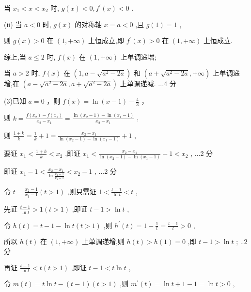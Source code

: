 \documentclass[10pt]{article}
\begin{document}
当 \({x}_{1} < x < {x}_{2}\) 时, \(g\left( x\right)  < 0,{f}^{\prime }\left( x\right)  < 0\) .

(ii) 当 \(a < 0\) 时, \(g\left( x\right)\) 的对称轴 \(x = a < 0\) ,且 \(g\left( 1\right)  = 1\) ,

则 \(g\left( x\right)  > 0\) 在 \(\left( {1, + \infty }\right)\) 上恒成立,即 \({f}^{\prime }\left( x\right)  > 0\) 在 \(\left( {1, + \infty }\right)\) 上恒成立.

综上,当 \(a \leq  2\) 时, \(f\left( x\right)\) 在 \(\left( {1, + \infty }\right)\) 上单调递增;

当 \(a > 2\) 时, \(f\left( x\right)\) 在 \(\left( {1,a - \sqrt{{a}^{2} - {2a}}}\right)\) 和 \(\left( {a + \sqrt{{a}^{2} - {2a}}, + \infty }\right)\) 上单调递增,在 \(\left( {a - \sqrt{{a}^{2} - {2a}},a + \sqrt{{a}^{2} - {2a}}}\right)\) 上单调递减. ...4 分

(3)已知 \(a = 0\) ，则 \(f\left( x\right)  = \ln \left( {x - 1}\right)  - \frac{4}{3}\) ，

则 \(k = \frac{f\left( {x}_{2}\right)  - f\left( {x}_{1}\right) }{{x}_{2} - {x}_{1}} = \frac{\ln \left( {{x}_{2} - 1}\right)  - \ln \left( {{x}_{1} - 1}\right) }{{x}_{2} - {x}_{1}}\) ,

则 \(\frac{1 + k}{k} = \frac{1}{k} + 1 = \frac{{x}_{2} - {x}_{1}}{\ln \left( {{x}_{2} - 1}\right)  - \ln \left( {{x}_{1} - 1}\right) } + 1\) ,

要证 \({x}_{1} < \frac{1 + k}{k} < {x}_{2}\) ,即证 \({x}_{1} < \frac{{x}_{2} - {x}_{1}}{\ln \left( {{x}_{2} - 1}\right)  - \ln \left( {{x}_{1} - 1}\right) } + 1 < {x}_{2}\) , ...2 分

即证 \({x}_{1} - 1 < \frac{{x}_{2} - {x}_{1}}{\ln \frac{{x}_{2} - 1}{{x}_{1} - 1}} < {x}_{2} - 1\) , ...2 分

令 \(t = \frac{{x}_{2} - 1}{{x}_{1} - 1}\left( {t > 1}\right)\) ,则只需证 \(1 < \frac{t - 1}{\ln t} < t\) ,

先证 \(\frac{t - 1}{\ln t} > 1\left( {t > 1}\right)\) ,即证 \(t - 1 > \ln t\) ,

令 \(h\left( t\right)  = t - 1 - \ln t\left( {t > 1}\right)\) ,则 \({h}^{\prime }\left( t\right)  = 1 - \frac{1}{t} = \frac{t - 1}{t} > 0\) ,

所以 \(h\left( t\right)\) 在 \(\left( {1, + \infty }\right)\) 上单调递增,则 \(h\left( t\right)  > h\left( 1\right)  = 0\) ,即 \(t - 1 > \ln t\) ; ..2 分

再证 \(\frac{t - 1}{\ln t} < t\left( {t > 1}\right)\) ,即证 \(t - 1 < t\ln t\) ,

令 \(m\left( t\right)  = t\ln t - \left( {t - 1}\right) \left( {t > 1}\right)\) ,则 \({m}^{\prime }\left( t\right)  = \ln t + 1 - 1 = \ln t > 0\) ,
\end{document}

